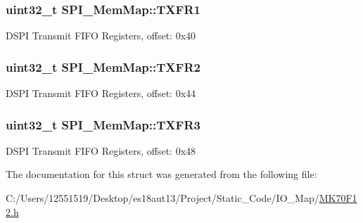 \subsubsection[{T\+X\+F\+R1}]{\setlength{\rightskip}{0pt plus 5cm}uint32\+\_\+t S\+P\+I\+\_\+\+Mem\+Map\+::\+T\+X\+F\+R1}\label{struct_s_p_i___mem_map_aa4c8bc4c6c43cb03d266084ead4948f6}
D\+S\+P\+I Transmit F\+I\+F\+O Registers, offset\+: 0x40 \hypertarget{struct_s_p_i___mem_map_a2e65235ded22e36d3dae2b17f172a32b}{}
\subsubsection[{T\+X\+F\+R2}]{\setlength{\rightskip}{0pt plus 5cm}uint32\+\_\+t S\+P\+I\+\_\+\+Mem\+Map\+::\+T\+X\+F\+R2}\label{struct_s_p_i___mem_map_a2e65235ded22e36d3dae2b17f172a32b}
D\+S\+P\+I Transmit F\+I\+F\+O Registers, offset\+: 0x44 \hypertarget{struct_s_p_i___mem_map_a817203724ca73f53cc544f887eeabd27}{}
\subsubsection[{T\+X\+F\+R3}]{\setlength{\rightskip}{0pt plus 5cm}uint32\+\_\+t S\+P\+I\+\_\+\+Mem\+Map\+::\+T\+X\+F\+R3}\label{struct_s_p_i___mem_map_a817203724ca73f53cc544f887eeabd27}
D\+S\+P\+I Transmit F\+I\+F\+O Registers, offset\+: 0x48 

The documentation for this struct was generated from the following file\+:\begin{DoxyCompactItemize}
\item 
C\+:/\+Users/12551519/\+Desktop/es18aut13/\+Project/\+Static\+\_\+\+Code/\+I\+O\+\_\+\+Map/\hyperlink{_m_k70_f12_8h}{M\+K70\+F12.\+h}\end{DoxyCompactItemize}
